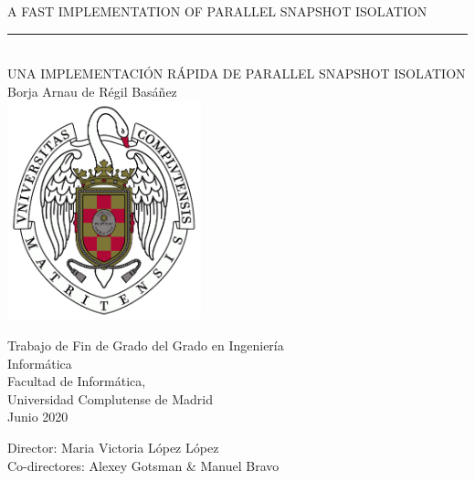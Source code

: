 \newpage
\thispagestyle{empty}
\begin{center}
   \vspace{1cm}
   {\Large A FAST IMPLEMENTATION OF PARALLEL SNAPSHOT ISOLATION}\\

   \rule{2in}{0.5pt}\\
   \vspace{0.4cm}
   {\Large UNA IMPLEMENTACIÓN RÁPIDA DE PARALLEL SNAPSHOT ISOLATION}\\

   \vspace{1cm}
   {\large Borja Arnau de Régil Basáñez}\\

   \vspace{0.85cm}
   \includegraphics[height=2.5in]{figures/escudo.png}

   \vspace{0.85cm}
   Trabajo de Fin de Grado del Grado en Ingeniería\\
   Informática\\

   \vspace{0.2cm}
   Facultad de Informática,\\
   Universidad Complutense de Madrid \\

   \vspace{1cm}
   Junio 2020
\end{center}

{\raggedleft
   \vspace{2cm}
   Director: Maria Victoria López López\\
   Co-directores: Alexey Gotsman \& Manuel Bravo\\
}
